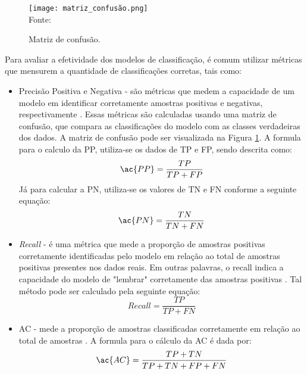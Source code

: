 \begin{figure}[htbp]
    \caption{Matriz de confusão.}
      \centering
      \texttt{[image: matriz\_confusão.png]} 
    \label{fig:matrizconfusao}
    \\ Fonte: 
\end{figure}

Para avaliar a efetividade dos modelos de classificação, é comum utilizar métricas que mensurem a quantidade de classificações corretas, tais como:
\begin{itemize}   
    \item Precisão Positiva e Negativa - são métricas que medem a capacidade de um modelo em identificar corretamente amostras positivas e negativas, respectivamente \cite{Xiaoci_Predicting}. Essas métricas são calculadas usando uma matriz de confusão, que compara as classificações do modelo com as classes verdadeiras dos dados. A matriz de confusão pode ser visualizada na Figura \ref{fig:matrizconfusao}. A formula para o calculo da \ac{PP}, utiliza-se os dados de \ac{TP} e \ac{FP}, sendo descrita como: 
    \begin{equation}
        \label{eq:PP}
        \ac{PP} = \frac{TP}{TP+FP}
    \end{equation}
    Já para calcular a \ac{PN}, utiliza-se os valores de \ac{TN} e \ac{FN} conforme a seguinte equação:
    \begin{equation}
        \label{eq:PN}
        \ac{PN} = \frac{TN}{TN + FN}
    \end{equation}

    \item \textit{Recall} - é uma métrica que mede a proporção de amostras positivas corretamente identificadas pelo modelo em relação ao total de amostras positivas presentes nos dados reais. Em outras palavras, o recall indica a capacidade do modelo de "lembrar" corretamente das amostras positivas \cite{ampomah2020evaluation}. Tal método pode ser calculado pela seguinte equação: 
    \begin{equation}
        \label{eq:recall}
        Recall = \frac{TP}{TP + FN}
    \end{equation}
    
    \item \ac{AC} - mede a proporção de amostras classificadas corretamente em relação ao total de amostras \cite{ampomah2020evaluation, Vinicius_Sistemas, lee2021exploring}. A formula para o cálculo da \ac{AC} é dada por:
    \begin{equation}
        \label{AC}
        \ac{AC} = \frac{TP + TN}{TP + TN + FP + FN}
    \end{equation}    
\end{itemize}


